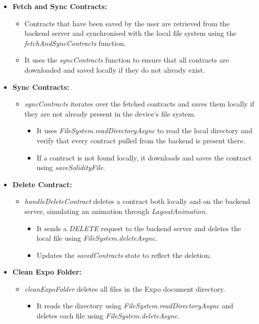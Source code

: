 \begin{itemize}
    \item \textbf{Fetch and Sync Contracts:}
    \begin{itemize}
        \item Contracts that have been saved by the user are retrieved from the backend server and synchronised with the local file system using the \textit{fetchAndSyncContracts} function.
        \item It uses the \textit{syncContracts} function to ensure that all contracts are downloaded and saved locally if they do not already exist.
    \end{itemize}

    \item \textbf{Sync Contracts:}
    \begin{itemize}
        \item \textit{syncContracts} iterates over the fetched contracts and saves them locally if they are not already present in the device's file system.
        \begin{itemize}
            \item It uses \textit{FileSystem.readDirectoryAsync} to read the local directory and verify that every contract pulled from the backend is present there.
            \item If a contract is not found locally, it downloads and saves the contract using \textit{saveSolidityFile}.
        \end{itemize}
    \end{itemize}

    \item \textbf{Delete Contract:}
    \begin{itemize}
        \item \textit{handleDeleteContract} deletes a contract both locally and on the backend server, simulating an animation through \textit{LayoutAnimation}.
        \begin{itemize}
            \item It sends a \textit{DELETE} request to the backend server and deletes the local file using \textit{FileSystem.deleteAsync}.
            \item Updates the \textit{savedContracts} state to reflect the deletion.
        \end{itemize}
    \end{itemize}

    \item \textbf{Clean Expo Folder:}
    \begin{itemize}
        \item \textit{cleanExpoFolder} deletes all files in the Expo document directory.
        \begin{itemize}
            \item It reads the directory using \textit{FileSystem.readDirectoryAsync} and deletes each file using \textit{FileSystem.deleteAsync}.
        \end{itemize}
    \end{itemize}


\end{itemize}
